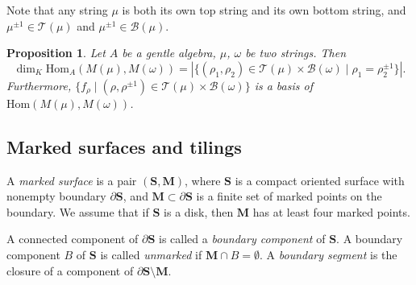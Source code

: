\documentclass[a4paper,10pt]{amsart}
\theoremstyle{plain}          %
\newtheorem{proposition}[theorem]{Proposition}
\theoremstyle{definition}
\def\Tcal{\mathcal{T}}
\def\Bcal{\mathcal{B}}
\def\SS{\mathbf{S}}
\def\MM{\mathbf{M}}
\def\Tcal{\mathcal{T}}
\def\MM{\mathbf{M}}
\newcommand{\Hom}{\mathrm{Hom}}
\begin{document}
Note that any string $\mu$ is both its own top string and its own bottom string, and $\mu^{\pm1}\in\Tcal(\mu)$ and $\mu^{\pm1}\in\Bcal(\mu)$.
 
 \begin{proposition}\cite{CB}\label{p:dim pro two strings}
		Let $A$ be a gentle algebra, $\mu$, $\omega$ be two strings. Then  $$\dim_{K}\Hom_{A}(M(\mu),M(\omega))=|\{(\rho_1,\rho_2)\in \mathcal{T}(\mu)\times \mathcal{B}(\omega)\mid {\rho_1}=\rho_2^{\pm 1}\}|.$$
        Furthermore, $\{f_\rho\mid (\rho,\rho^{\pm1})\in\Tcal(\mu)\times\Bcal(\omega)\}$ is a basis of $\Hom (M(\mu),M(\omega))$.
	\end{proposition}

\subsection{Marked surfaces and tilings}\label{ss:tiling}
A \emph{marked surface} is a pair $(\SS,\MM)$, where $\SS$ is a compact oriented surface with nonempty boundary $\partial \SS$,  and $\MM\subset \partial \SS$ is a finite set of marked points on the boundary.  We assume that if $\SS$ is a disk, then $\MM$ has at least four marked points.

A connected component of $\partial \SS$ is called a \emph{boundary component} of $\SS$. A boundary component $B$ of $\SS$ is called \emph{unmarked} if $\MM\cap B=\emptyset$. A \emph{boundary segment} is the closure of a component of $\partial \SS\setminus \MM$. 
\end{document}
